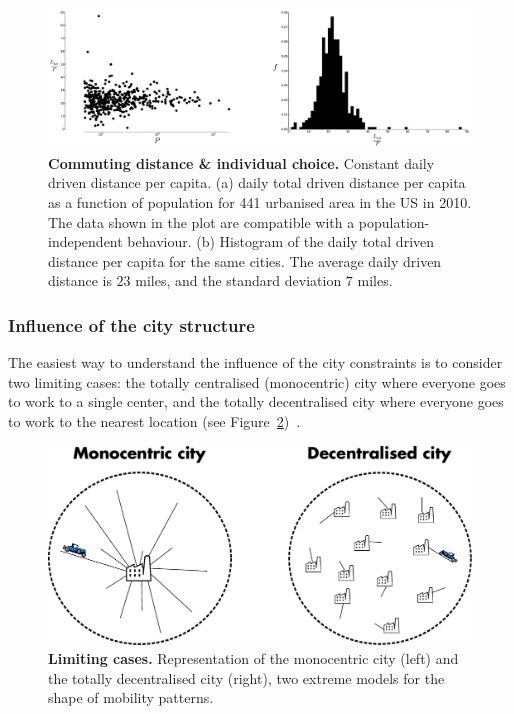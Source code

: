 \begin{figure}[!h]
    \includegraphics[width=1.0\textwidth]{gfx/chapter-scaling/figure_2.pdf}
    \caption{{\bf Commuting distance \& individual choice.} Constant daily driven distance per capita. (a) daily total driven
        distance per capita as a function of population for 441 urbanised area
        in the US in 2010. The data shown in the plot are compatible with a
    population-independent behaviour. (b) Histogram of the daily total driven
distance per capita for the same cities. The average daily driven distance is $23$ miles, and the standard deviation $7$ miles.}
\label{fig:LtotoverP} 
\end{figure}



\subsubsection{Influence of the city structure}
\label{sub:influence_of_the_city_structure}

The easiest way to understand the influence of the city constraints is to
consider two limiting cases: the totally centralised
(monocentric) city where everyone goes to work to a single center, and the
totally decentralised city where everyone goes to work to the nearest
location (see Figure~\ref{fig:monocentric_decentralised})~\cite{Samaniego:2008}.\\

\begin{figure}[!h]
    \centering
    \includegraphics[width=1\textwidth]{gfx/chapter-scaling/monocentric-decentralised.pdf}
    \caption{{\bf Limiting cases.} Representation of the monocentric city (left) and the totally
    decentralised city (right), two extreme models for the shape of mobility
patterns.\label{fig:monocentric_decentralised}}
\end{figure}

